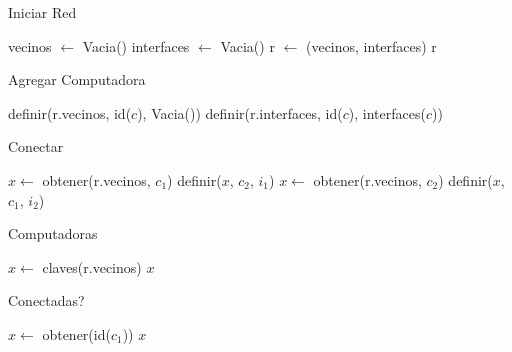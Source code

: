 \begin{Algoritmos}


\begin{algorithm}
\caption{Iniciar Red}
\begin{algorithmic}[1]
  \State vecinos $\gets$ Vacia()
  \State interfaces $\gets$ Vacia()
  \State r $\gets$ (vecinos, interfaces)
  \State \Return r
  \EndProcedure
\end{algorithmic}
\end{algorithm}




\begin{algorithm}
\caption{Agregar Computadora}
\begin{algorithmic}[1]
  \State definir(r.vecinos, id($c$), Vacia())
  \State definir(r.interfaces, id($c$), interfaces($c$))
 \EndProcedure
\end{algorithmic}
\end{algorithm}


\begin{algorithm}
\caption{Conectar}
\begin{algorithmic}[1]
  \State $x \gets$ obtener(r.vecinos, $c_1$)
  \State definir($x$, $c_2$, $i_1$)
  \State $x \gets$ obtener(r.vecinos, $c_2$)
  \State definir($x$, $c_1$, $i_2$)
 \EndProcedure
\end{algorithmic}
\end{algorithm}


\begin{algorithm}
\caption{Computadoras}
\begin{algorithmic}[1]
  \State $x \gets$ claves(r.vecinos)
  \State \Return $x$
 \EndProcedure
\end{algorithmic}
\end{algorithm}


\begin{algorithm}
\caption{Conectadas?}
\begin{algorithmic}[1]
  \State $x \gets$ obtener(id($c_1$))
  \State \Return $x$
 \EndProcedure
\end{algorithmic}
\end{algorithm}












\end{Algoritmos}

